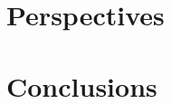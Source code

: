 \documentclass[compress,red]{beamer}
\begin{document}
\section{Perspectives}


\section{Conclusions}






\end{document}

